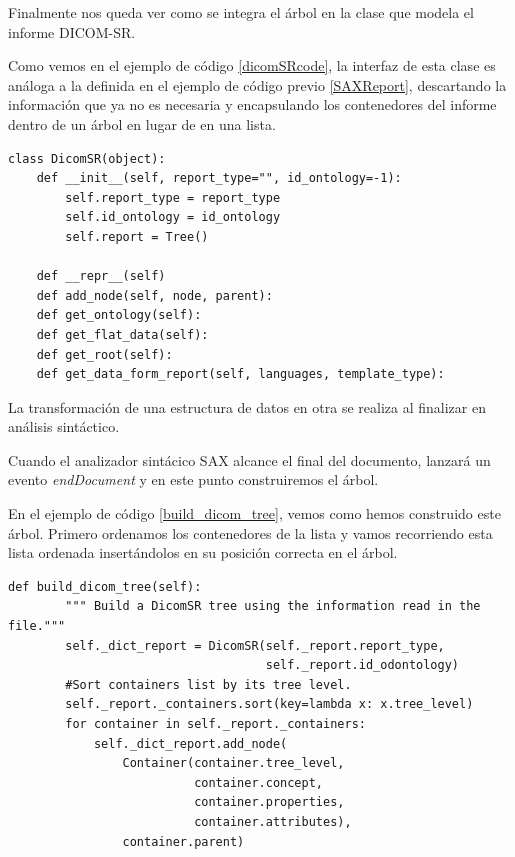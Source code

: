 Finalmente nos queda ver como se integra el árbol en la clase que modela el informe DICOM-SR.\par
Como vemos en el ejemplo de código \ref{dicomSRcode}, la interfaz de esta clase es análoga a la definida en el ejemplo de código previo \ref{SAXReport}, descartando la información que ya no es necesaria y encapsulando los contenedores del informe dentro de un árbol en lugar de en una lista.\par

\begin{lstlisting}[label=dicomSRcode,caption=Clase para contenedores DICOM-SR]
class DicomSR(object):
    def __init__(self, report_type="", id_ontology=-1):
        self.report_type = report_type
        self.id_ontology = id_ontology
        self.report = Tree()

    def __repr__(self)
    def add_node(self, node, parent):
    def get_ontology(self):
    def get_flat_data(self):
    def get_root(self):
    def get_data_form_report(self, languages, template_type):
\end{lstlisting}

La transformación de una estructura de datos en otra se realiza al finalizar en análisis sintáctico. \par
Cuando el analizador sintácico SAX alcance el final del documento, lanzará un evento \emph{endDocument} y en este punto construiremos el árbol. \par
En el ejemplo de código \ref{build_dicom_tree}, vemos como hemos construido este árbol. Primero ordenamos los contenedores de la lista y vamos recorriendo esta lista ordenada insertándolos en su posición correcta en el árbol. \par

\begin{lstlisting}[label=build_dicom_tree,caption=Constructor de un árbol DICOM-SR]
    def build_dicom_tree(self):
        """ Build a DicomSR tree using the information read in the file."""
        self._dict_report = DicomSR(self._report.report_type,
                                    self._report.id_odontology)
        #Sort containers list by its tree level.
        self._report._containers.sort(key=lambda x: x.tree_level)
        for container in self._report._containers:
            self._dict_report.add_node(
                Container(container.tree_level, 
                		  container.concept,
                          container.properties,
                          container.attributes),
                container.parent)
\end{lstlisting}

